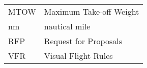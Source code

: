 {\begin{longtable*}{@{}l @{\quad=\quad} l@{}}
    MTOW & Maximum Take-off Weight \\
    nm & nautical mile \\
    RFP & Request for Proposals \\
    VFR & Visual Flight Rules \\
\end{longtable*}}
